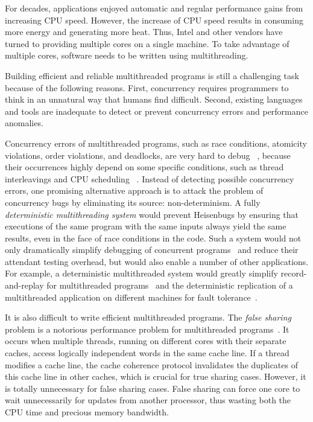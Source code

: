 For decades, applications enjoyed automatic and regular performance gains from increasing CPU speed.  However, the increase of CPU speed results in consuming more energy and generating more heat. Thus, Intel and other vendors have turned to providing multiple cores on a single machine. To take advantage of multiple cores, software needs to be written using multithreading. 

Building efficient and reliable multithreaded programs is still a challenging task because of the following reasons. First, concurrency requires programmers to think in an unnatural way that humans find difficult.  Second, existing languages and tools are inadequate to detect or prevent concurrency errors and performance anomalies. 

Concurrency errors of multithreaded programs, such as race conditions, atomicity violations, order violations, and deadlocks, are very hard to debug ~\cite{Lu:2008:LMC:1346281.1346323}, because their occurrences highly depend on some specific conditions, such as thread interleavings and CPU scheduling ~\cite{DBLP:conf/icse/BallBHMQ09,DBLP:conf/asplos/BurckhardtKMN10}. Instead of detecting possible concurrency errors, one promising alternative approach is to attack the problem of concurrency bugs by eliminating its source: non-determinism. A fully \emph{deterministic multithreading system} would prevent Heisenbugs by ensuring that executions of the same program with the same inputs always yield the same results, even in the face of race conditions in the code. Such a system would not only dramatically simplify debugging of concurrent
programs~\cite{Carver:1991:RTC:624586.625040} and reduce their attendant testing overhead, but would also enable a number of other applications. For example, a deterministic multithreaded system would greatly simplify record-and-replay for multithreaded programs~\cite{Choi:1998:DRJ:281035.281041,LeBlanc:1987:DPP:32387.32396} and the deterministic replication of a multithreaded application on different machines for fault tolerance~\cite{deterministic-process-groups,1134000,224058,replicant-hotos}.

It is also difficult to write efficient multithreaded programs. The {\it false sharing} problem is a notorious performance problem for multithreaded programs~\cite{falseshare:effect, falseshare:Analysis}. It occurs when multiple threads, running on different cores with their separate caches, access logically independent words in the same cache line. If a thread modifies  a cache line, the cache coherence protocol invalidates the duplicates of this cache line in other caches, which is crucial for true sharing cases. However, it is totally unnecessary for false sharing cases. False sharing can force one core to wait unnecessarily for updates from another processor, thus wasting both the CPU time and precious memory bandwidth. 

